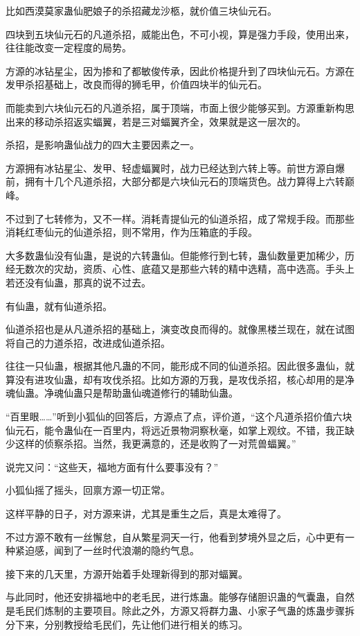 \begin{this_body}
比如西漠莫家蛊仙肥娘子的杀招藏龙沙柩，就价值三块仙元石。

四块到五块仙元石的凡道杀招，威能出色，不可小视，算是强力手段，使用出来，往往能改变一定程度的局势。

方源的冰钻星尘，因为掺和了都敏俊传承，因此价格提升到了四块仙元石。方源在发甲杀招基础上，改良而得的狮毛甲，价值四块半的仙元石。

而能卖到六块仙元石的凡道杀招，属于顶端，市面上很少能够买到。方源重新构思出来的移动杀招返实蝠翼，若是三对蝠翼齐全，效果就是这一层次的。

杀招，是影响蛊仙战力的四大主要因素之一。

方源拥有冰钻星尘、发甲、轻虚蝠翼时，战力已经达到六转上等。前世方源自爆前，拥有十几个凡道杀招，大部分都是六块仙元石的顶端货色。战力算得上六转巅峰。

不过到了七转修为，又不一样。消耗青提仙元的仙道杀招，成了常规手段。而那些消耗红枣仙元的仙道杀招，则不常用，作为压箱底的手段。

大多数蛊仙没有仙蛊，是说的六转蛊仙。但能修行到七转，蛊仙数量更加稀少，历经无数次的灾劫，资质、心性、底蕴又是那些六转的精中选精，高中选高。手头上若还没有仙蛊，那真的说不过去。

有仙蛊，就有仙道杀招。

仙道杀招也是从凡道杀招的基础上，演变改良而得的。就像黑楼兰现在，就在试图将自己的力道杀招，改进成仙道杀招。

往往一只仙蛊，根据其他凡蛊的不同，能形成不同的仙道杀招。因此很多蛊仙，就算没有进攻仙蛊，却有攻伐杀招。比如方源的万我，是攻伐杀招，核心却用的是净魂仙蛊。净魂仙蛊只是帮助蛊仙魂道修行的辅助仙蛊。

“百里眼……”听到小狐仙的回答后，方源点了点，评价道，“这个凡道杀招价值六块仙元石，能令蛊仙在一百里内，将远近景物洞察秋毫，如掌上观纹。不错，我正缺少这样的侦察杀招。当然，我更满意的，还是收购了一对荒兽蝠翼。”

说完又问：“这些天，福地方面有什么要事没有？”

小狐仙摇了摇头，回禀方源一切正常。

这样平静的日子，对方源来讲，尤其是重生之后，真是太难得了。

不过方源不敢有一丝懈怠，自从繁星洞天一行，他看到梦境外显之后，心中更有一种紧迫感，闻到了一丝时代浪潮的隐约气息。

接下来的几天里，方源开始着手处理新得到的那对蝠翼。

与此同时，他还安排福地中的老毛民，进行炼蛊。能够存储胆识蛊的气囊蛊，自然是毛民们炼制的主要项目。除此之外，方源又将群力蛊、小家子气蛊的炼蛊步骤拆分下来，分别教授给毛民们，先让他们进行相关的练习。


\end{this_body}
